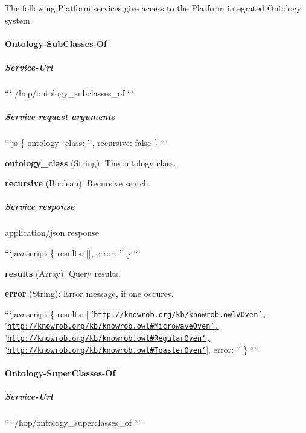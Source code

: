 The following Platform services give access to the Platform integrated Ontology system.

\paragraph*{Ontology-\/\-Sub\-Classes-\/\-Of}

\subparagraph*{Service-\/\-Url}

``` /hop/ontology\-\_\-subclasses\-\_\-of ```

\subparagraph*{Service request arguments}

```js \{ ontology\-\_\-class\-: '', recursive\-: false \} ```
\begin{DoxyItemize}
\item {\bfseries ontology\-\_\-class} (String)\-: The ontology class.
\item {\bfseries recursive} (Boolean)\-: Recursive search.
\end{DoxyItemize}

\subparagraph*{Service response}

application/json response.

```javascript \{ results\-: \mbox{[}\mbox{]}, error\-: '' \} ```


\begin{DoxyItemize}
\item {\bfseries results} (Array)\-: Query results.
\item {\bfseries error} (String)\-: Error message, if one occures.
\end{DoxyItemize}

```javascript \{ results\-: \mbox{[} '\href{http://knowrob.org/kb/knowrob.owl#Oven',}{\tt http\-://knowrob.\-org/kb/knowrob.\-owl\#\-Oven',} '\href{http://knowrob.org/kb/knowrob.owl#MicrowaveOven',}{\tt http\-://knowrob.\-org/kb/knowrob.\-owl\#\-Microwave\-Oven',} '\href{http://knowrob.org/kb/knowrob.owl#RegularOven',}{\tt http\-://knowrob.\-org/kb/knowrob.\-owl\#\-Regular\-Oven',} '\href{http://knowrob.org/kb/knowrob.owl#ToasterOven'}{\tt http\-://knowrob.\-org/kb/knowrob.\-owl\#\-Toaster\-Oven'}\mbox{]}, error\-: '' \} ```

\paragraph*{Ontology-\/\-Super\-Classes-\/\-Of}

\subparagraph*{Service-\/\-Url}

``` /hop/ontology\-\_\-superclasses\-\_\-of ```

